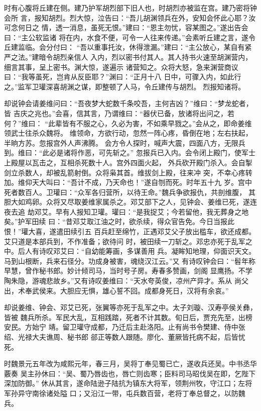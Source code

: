 时有心腹将丘建在侧。建乃护军胡烈部下旧人也，时胡烈亦被监在宫。建乃密将钟会所
言，报知胡烈。烈大惊，泣告曰：“吾儿胡渊领兵在外，安知会怀此心耶？汝可念何日之
情，透一消息，虽死无恨。”建曰：“恩主勿忧，容某图之。”遂出告会曰：“主公软监诸
将在内，水食不便，可令一人往来传递。”会素听丘建之言，遂令丘建监临。会分付曰：
“吾以重事托汝，休得泄漏。”建曰：“主公放心，某自有紧严之法。”建暗令胡烈亲信人
入内，烈以密书付其人。其人持书火速至胡渊营内，细言其事，呈上密书。渊大惊，遂遍示
诸营知之。众将大怒，急来渊营商议曰：“我等虽死，岂肯从反臣耶？”渊曰：“正月十八
日中，可骤入内，如此行之。”监军卫瓘深喜胡渊之谋，即整顿了人马，令丘建传与胡烈。
烈报知诸将。

却说钟会请姜维问曰：“吾夜梦大蛇数千条咬吾，主何吉凶？”维曰：“梦龙蛇者，皆
吉庆之兆也。”会喜，信其言，乃谓维曰：“器伏已备，放诸将出问之，若何？”维曰：
“此辈皆有不服之心，久必为害，不如乘早戮之。”会从之，即命姜维领武士往杀众魏将。
维领命，方欲行动，忽然一阵心疼，昏倒在地；左右扶起，半晌方苏。忽报宫外人声沸腾。
会方令人探时，喊声大震，四面八方，无限兵到。维曰：“此必是诸将作恶，可先斩之。”
忽报兵已入内。会令闭上殿门，使军士上殿屋以瓦击之，互相杀死数十人。宫外四面火起，
外兵砍开殿门杀入。会自掣剑立杀数人，却被乱箭射倒。众将枭其首。维拔剑上殿，往来冲
突，不幸心疼转加。维仰天大叫曰：“吾计不成，乃天命也！”遂自刎而死。时年五十九
岁。宫中死者数百人。卫瓘曰：“众军各归营所，以待王命。”魏兵争欲报仇，共剖维腹，
其胆大如鸡卵。众将又尽取姜维家属杀之。邓艾部下之人，见钟会、姜维已死，遂连夜去追
劫邓艾。早有人报知卫瓘。瓘曰：“是我捉艾；今若留他，我无葬身之地矣。”护军田续
曰：“昔邓艾取江油之时，欲杀续，得众官告免。今日当报此恨！”瓘大喜，遂遣田续引五
百兵赶至绵竹，正遇邓艾父子放出槛车，欲还成都。艾只道是本部兵到，不作准备；欲待问
时，被田续一刀斩之。邓忠亦死于乱军之中。后人有诗叹邓艾曰：“自幼能筹画，多谋善用
兵。凝眸知地理，仰面识天文。马到山根断，兵来石径分。功成身被害，魂绕汉江云。”又
有诗叹钟会曰：“髫年称早慧，曾作秘书郎。妙计倾司马，当时号子房。寿春多赞画，剑阁
显鹰扬。不学陶朱隐，游魂悲故乡。”又有诗叹姜维曰：“天水夸英俊，凉州产异才。系从
尚父出，术奉武侯来。大胆应无惧，雄心誓不回。成都身死日，汉将有余哀。”

却说姜维、钟会、邓艾已死，张翼等亦死于乱军之中。太子刘璇、汉寿亭侯关彝，皆被
魏兵所杀。军民大乱，互相践踏，死者不计其数。旬日后，贾充先至，出榜安民。方始宁
靖。留卫瓘守成都，乃迁后主赴洛阳。止有尚书令樊建、侍中张绍、光禄大夫谯周、秘书郎
郤正等数人跟随。廖化、董厥皆托病不起，后皆忧死。

时魏景元五年改为咸熙元年，春三月，吴将丁奉见蜀已亡，遂收兵还吴。中书丞华覈奏
吴主孙休曰：“吴、蜀乃唇齿也，唇亡则齿寒；臣料司马昭伐吴在即，乞陛下深加防御。”
休从其言，遂命陆逊子陆抗为镇东大将军，领荆州牧，守江口；左将军孙异守南徐诸处隘
口；又沿江一带，屯兵数百营，老将丁奉总督之，以防魏兵。

